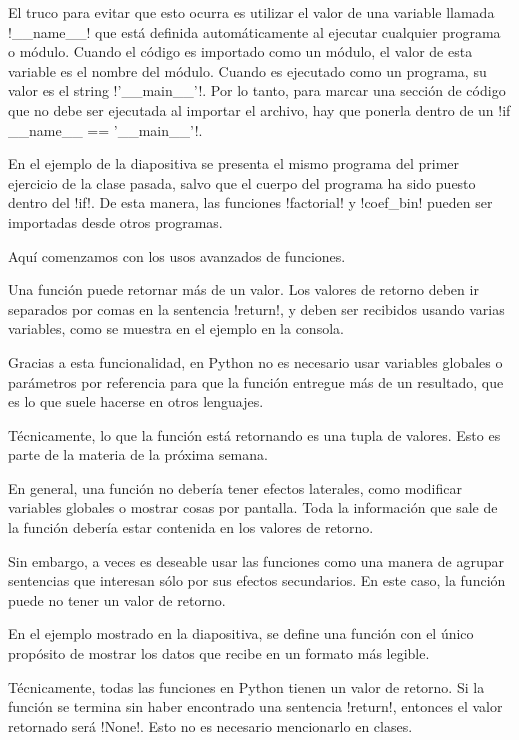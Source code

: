 \documentclass[10pt]{article}
\begin{document}
  El truco para evitar que esto ocurra es utilizar el valor
  de una variable llamada \li!__name__!
  que está definida automáticamente al ejecutar cualquier programa o módulo.
  Cuando el código es importado como un módulo,
  el valor de esta variable es el nombre del módulo.
  Cuando es ejecutado como un programa,
  su valor es el string \li!'__main__'!.
  Por lo tanto,
  para marcar una sección de código que no debe ser ejecutada
  al importar el archivo,
  hay que ponerla dentro de un \li!if __name__ == '__main__'!.

  En el ejemplo de la diapositiva
  se presenta el mismo programa del primer ejercicio de la clase pasada,
  salvo que el cuerpo del programa ha sido puesto dentro del \li!if!.
  De esta manera, las funciones \li!factorial! y \li!coef_bin!
  pueden ser importadas desde otros programas.


  Aquí comenzamos con los usos avanzados de funciones.

  Una función puede retornar más de un valor.
  Los valores de retorno deben ir separados por comas
  en la sentencia \li!return!,
  y deben ser recibidos usando varias variables,
  como se muestra en el ejemplo en la consola.

  Gracias a esta funcionalidad,
  en Python no es necesario usar variables globales o parámetros por referencia
  para que la función entregue más de un resultado,
  que es lo que suele hacerse en otros lenguajes.

  Técnicamente,
  lo que la función está retornando es una tupla de valores.
  Esto es parte de la materia de la próxima semana.


  En general, una función no debería tener efectos laterales,
  como modificar variables globales o mostrar cosas por pantalla.
  Toda la información que sale de la función
  debería estar contenida en los valores de retorno.

  Sin embargo,
  a veces es deseable usar las funciones
  como una manera de agrupar sentencias
  que interesan sólo por sus efectos secundarios.
  En este caso, la función puede no tener un valor de retorno.

  En el ejemplo mostrado en la diapositiva,
  se define una función con el único propósito
  de mostrar los datos que recibe en un formato más legible.

  Técnicamente, todas las funciones en Python tienen un valor de retorno.
  Si la función se termina sin haber encontrado una sentencia \li!return!,
  entonces el valor retornado será \li!None!.
  Esto no es necesario mencionarlo en clases.
\end{document}
